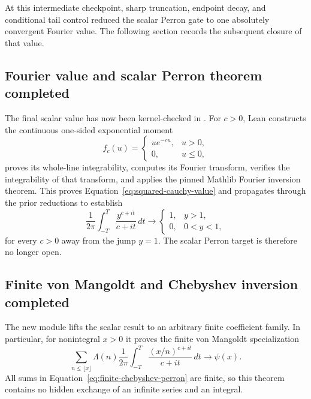 \documentclass[11pt,a4paper]{article}
\begin{document}
\begin{resultbox}
At this intermediate checkpoint, sharp truncation, endpoint decay, and
conditional tail control reduced the scalar Perron gate to one absolutely
convergent Fourier value. The following section records the subsequent closure
of that value.
\end{resultbox}

\subsection{Fourier value and scalar Perron theorem completed}

The final scalar value has now been kernel-checked in
. For $c>0$, Lean constructs
the continuous one-sided exponential moment
\[
  f_c(u)=\begin{cases}u e^{-cu},&u>0,\\0,&u\leq0,\end{cases}
\]
proves its whole-line integrability, computes its Fourier transform, verifies
the integrability of that transform, and applies the pinned Mathlib Fourier
inversion theorem. This proves Equation~\eqref{eq:squared-cauchy-value} and
propagates through the prior reductions to establish
\[
  \frac1{2\pi}\int_{-T}^{T}\frac{y^{c+it}}{c+it}\,dt
  \longrightarrow
  \begin{cases}1,&y>1,\\0,&0<y<1,\end{cases}
\]
for every $c>0$ away from the jump $y=1$. The scalar Perron target is therefore
no longer open.

\subsection{Finite von Mangoldt and Chebyshev inversion completed}

The new module  lifts the scalar
result to an arbitrary finite coefficient family. In particular, for
nonintegral $x>0$ it proves the finite von Mangoldt specialization
\begin{equation}
  \sum_{n\leq\lfloor x\rfloor}\Lambda(n)
    \frac1{2\pi}\int_{-T}^{T}
      \frac{(x/n)^{c+it}}{c+it}\,dt
  \longrightarrow \psi(x).
  \label{eq:finite-chebyshev-perron}
\end{equation}
All sums in Equation~\eqref{eq:finite-chebyshev-perron} are finite, so this
theorem contains no hidden exchange of an infinite series and an integral.
\end{document}
